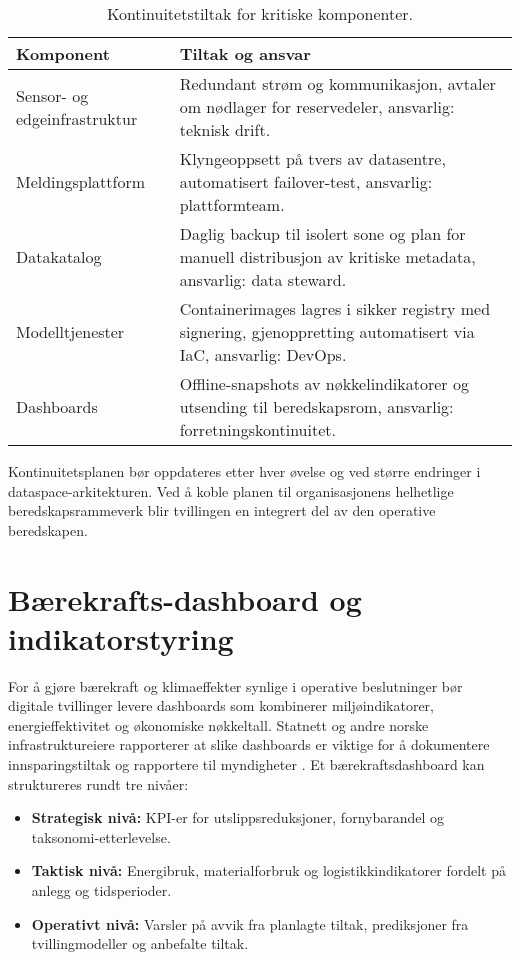 \begin{table}[ht]
    \centering
    \caption{Kontinuitetstiltak for kritiske komponenter.}
    \label{tab:kap03-kontinuitet}
    \begin{tabular}{p{}p{}}
        \toprule
        \textbf{Komponent} & \textbf{Tiltak og ansvar} \\
        \midrule
        Sensor- og edgeinfrastruktur & Redundant strøm og kommunikasjon, avtaler om nødlager for reservedeler, ansvarlig: teknisk drift. \\
        Meldingsplattform & Klyngeoppsett på tvers av datasentre, automatisert failover-test, ansvarlig: plattformteam. \\
        Datakatalog & Daglig backup til isolert sone og plan for manuell distribusjon av kritiske metadata, ansvarlig: data steward. \\
        Modelltjenester & Containerimages lagres i sikker registry med signering, gjenoppretting automatisert via IaC, ansvarlig: DevOps. \\
        Dashboards & Offline-snapshots av nøkkelindikatorer og utsending til beredskapsrom, ansvarlig: forretningskontinuitet. \\
        \bottomrule
    \end{tabular}
\end{table}

Kontinuitetsplanen bør oppdateres etter hver øvelse og ved større endringer i dataspace-arkitekturen. Ved å koble planen til
organisasjonens helhetlige beredskapsrammeverk blir tvillingen en integrert del av den operative beredskapen.

\section{Bærekrafts-dashboard og indikatorstyring}
For å gjøre bærekraft og klimaeffekter synlige i operative beslutninger bør digitale tvillinger levere dashboards som kombinerer
miljøindikatorer, energieffektivitet og økonomiske nøkkeltall. Statnett og andre norske infrastruktureiere rapporterer at slike
dashboards er viktige for å dokumentere innsparingstiltak og rapportere til myndigheter \citep{statnett2024baerekraft}. Et
bærekraftsdashboard kan struktureres rundt tre nivåer:
\begin{itemize}
    \item \textbf{Strategisk nivå:} KPI-er for utslippsreduksjoner, fornybarandel og taksonomi-etterlevelse.
    \item \textbf{Taktisk nivå:} Energibruk, materialforbruk og logistikkindikatorer fordelt på anlegg og tidsperioder.
    \item \textbf{Operativt nivå:} Varsler på avvik fra planlagte tiltak, prediksjoner fra tvillingmodeller og anbefalte tiltak.
\end{itemize}

